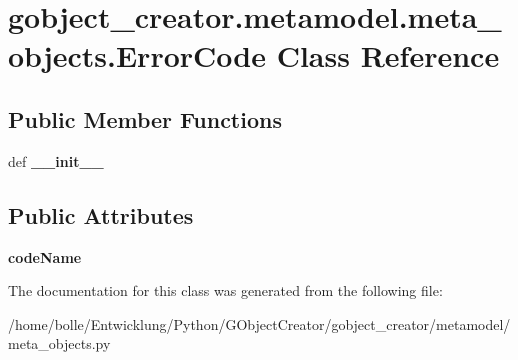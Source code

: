 \hypertarget{classgobject__creator_1_1metamodel_1_1meta__objects_1_1ErrorCode}{
\section{gobject\_\-creator.metamodel.meta\_\-objects.ErrorCode Class Reference}
\label{classgobject__creator_1_1metamodel_1_1meta__objects_1_1ErrorCode}
}
\subsection*{Public Member Functions}
\begin{DoxyCompactItemize}
\item 
\hypertarget{classgobject__creator_1_1metamodel_1_1meta__objects_1_1ErrorCode_aed5f5e3f62053d0dc752530259ec3431}{
def {\bfseries \_\-\_\-init\_\-\_\-}}
\label{classgobject__creator_1_1metamodel_1_1meta__objects_1_1ErrorCode_aed5f5e3f62053d0dc752530259ec3431}

\end{DoxyCompactItemize}
\subsection*{Public Attributes}
\begin{DoxyCompactItemize}
\item 
\hypertarget{classgobject__creator_1_1metamodel_1_1meta__objects_1_1ErrorCode_ac9d66149231baa17efa597b4c8311e5b}{
{\bfseries codeName}}
\label{classgobject__creator_1_1metamodel_1_1meta__objects_1_1ErrorCode_ac9d66149231baa17efa597b4c8311e5b}

\end{DoxyCompactItemize}


The documentation for this class was generated from the following file:\begin{DoxyCompactItemize}
\item 
/home/bolle/Entwicklung/Python/GObjectCreator/gobject\_\-creator/metamodel/meta\_\-objects.py\end{DoxyCompactItemize}

